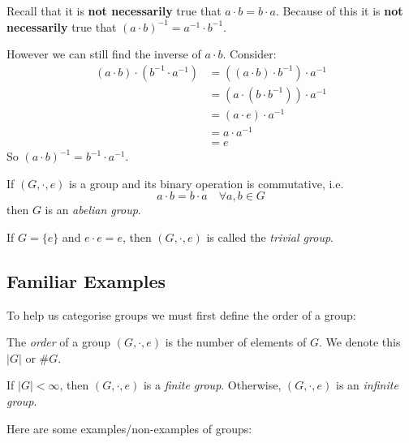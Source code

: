 \documentclass[../main.tex]{subfiles}
\begin{document}
\begin{remark}[Warning]
Recall that it is \textbf{not necessarily} true that $a \cdot b = b \cdot a$.
Because of this it is \textbf{not necessarily} true that $(a \cdot b)^{-1} = a^{-1} \cdot b^{-1}$.
\end{remark}
However we can still find the inverse of $a \cdot b$.
Consider:
\begin{align*}
  (a \cdot b) \cdot (b^{-1} \cdot a^{-1}) &= \left((a \cdot b) \cdot b^{-1}\right) \cdot a^{-1} \\
                                          &= \left(a \cdot (b \cdot b^{-1})\right) \cdot a^{-1} \\
                                          &= (a \cdot e) \cdot a^{-1} \\
                                          &= a \cdot a^{-1} \\
                                          &= e
\end{align*}
So $(a \cdot b)^{-1} = b^{-1} \cdot a^{-1}$.
\begin{definition}
  If $(G, \cdot, e)$ is a group and its binary operation is commutative, i.e.
  \[
    a \cdot b = b \cdot a \quad \forall a, b \in G
  \]
  then $G$ is an \textit{abelian group}.
\end{definition}
\begin{example}
  If $G = \{ e \}$ and $e \cdot e = e$, then $(G, \cdot, e)$ is called the \textit{trivial group}.
\end{example}

\subsection{Familiar Examples}
To help us categorise groups we must first define the order of a group:
\begin{definition}
  The \textit{order} of a group $(G, \cdot, e)$  is the number of elements of $G$.
  We denote this $|G|$ or $\#G$.
\end{definition}
\begin{definition}
  If $|G| < \infty$, then $(G, \cdot, e)$ is a \textit{finite group}.
  Otherwise, $(G, \cdot, e)$ is an \textit{infinite group}.
\end{definition}
Here are some examples/non-examples of groups:
\end{document}
